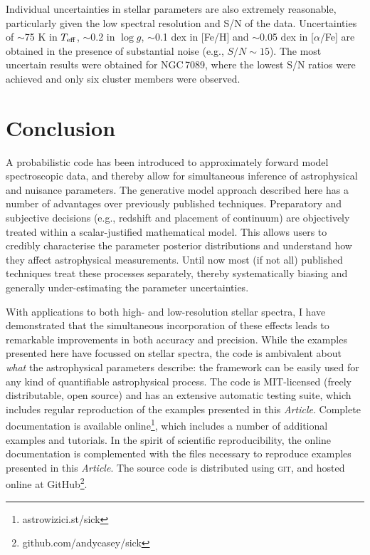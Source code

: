 \documentclass[iop]{emulateapj}
\newcommand{\article}{\textit{Article}}
\begin{document}
Individual uncertainties in stellar parameters are also extremely reasonable, 
particularly given the low spectral resolution and S/N of the data. Uncertainties 
of $\sim$75 K in $T_{\rm eff}$, $\sim$0.2 in $\log{g}$, $\sim$0.1 dex in [Fe/H] 
and $\sim$0.05 dex in [$\alpha$/Fe] are obtained in the presence of substantial 
noise (e.g., $S/N \sim 15$). The most uncertain results were obtained for 
{NGC\,7089}, where the lowest S/N ratios were achieved and only six cluster members were 
observed.

\section{Conclusion}
\label{sec:conclusions}

A probabilistic code has been introduced to approximately forward model 
spectroscopic data, and thereby allow for simultaneous inference of astrophysical 
and nuisance parameters. The generative model approach described here has a number 
of advantages over previously published techniques. Preparatory and subjective 
decisions (e.g., redshift and placement of continuum) are objectively treated 
within a scalar-justified mathematical model. This allows users to credibly 
characterise the parameter posterior distributions and understand how they affect 
astrophysical measurements. Until now most (if not all) published techniques treat 
these processes separately, thereby systematically biasing and generally 
under-estimating the parameter uncertainties.

With applications to both high- and low-resolution stellar spectra, I have 
demonstrated that the simultaneous incorporation of these effects leads to 
remarkable improvements in both accuracy and precision. While the examples 
presented here have focussed on stellar spectra, the code is ambivalent about 
\textit{what} the astrophysical parameters describe: the framework can be easily 
used for any kind of quantifiable astrophysical process. The code is MIT-licensed 
(freely distributable, open source) and has an extensive automatic testing suite, 
which includes regular reproduction of the examples presented in this \article{}. 
Complete documentation is available online\footnote{astrowizici.st/sick}, 
which includes a number of additional examples and tutorials. In the spirit of 
scientific reproducibility, the online documentation is complemented with the 
files necessary to reproduce examples presented in this \article{}. 
The source code is distributed using \textsc{git}, and hosted online at 
GitHub\footnote{github.com/andycasey/sick}. 
\end{document}
